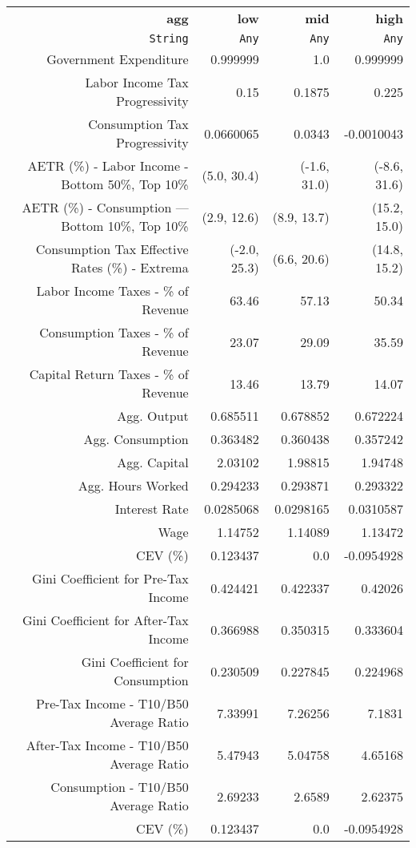 \begin{tabular}{rrrr}
  \hline
  \textbf{agg} & \textbf{low} & \textbf{mid} & \textbf{high} \\
  \texttt{String} & \texttt{Any} & \texttt{Any} & \texttt{Any} \\\hline
  Government Expenditure & 0.999999 & 1.0 & 0.999999 \\
  Labor Income Tax Progressivity & 0.15 & 0.1875 & 0.225 \\
  Consumption Tax Progressivity & 0.0660065 & 0.0343 & -0.0010043 \\
  AETR (\%) - Labor Income - Bottom 50\%, Top 10\% & (5.0, 30.4) & (-1.6, 31.0) & (-8.6, 31.6) \\
  AETR (\%) - Consumption — Bottom 10\%, Top 10\% & (2.9, 12.6) & (8.9, 13.7) & (15.2, 15.0) \\
  Consumption Tax Effective Rates (\%) - Extrema & (-2.0, 25.3) & (6.6, 20.6) & (14.8, 15.2) \\
  Labor Income Taxes - \% of Revenue & 63.46 & 57.13 & 50.34 \\
  Consumption Taxes - \% of Revenue & 23.07 & 29.09 & 35.59 \\
  Capital Return Taxes - \% of Revenue & 13.46 & 13.79 & 14.07 \\
  Agg. Output & 0.685511 & 0.678852 & 0.672224 \\
  Agg. Consumption & 0.363482 & 0.360438 & 0.357242 \\
  Agg. Capital & 2.03102 & 1.98815 & 1.94748 \\
  Agg. Hours Worked & 0.294233 & 0.293871 & 0.293322 \\
  Interest Rate & 0.0285068 & 0.0298165 & 0.0310587 \\
  Wage & 1.14752 & 1.14089 & 1.13472 \\
  CEV (\%) & 0.123437 & 0.0 & -0.0954928 \\
  Gini Coefficient for Pre-Tax Income & 0.424421 & 0.422337 & 0.42026 \\
  Gini Coefficient for After-Tax Income & 0.366988 & 0.350315 & 0.333604 \\
  Gini Coefficient for Consumption & 0.230509 & 0.227845 & 0.224968 \\
  Pre-Tax Income - T10/B50 Average Ratio & 7.33991 & 7.26256 & 7.1831 \\
  After-Tax Income - T10/B50 Average Ratio & 5.47943 & 5.04758 & 4.65168 \\
  Consumption - T10/B50 Average Ratio & 2.69233 & 2.6589 & 2.62375 \\
  CEV (\%) & 0.123437 & 0.0 & -0.0954928 \\\hline
\end{tabular}
